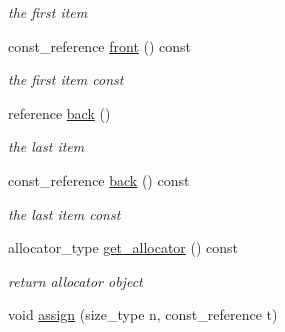 \begin{DoxyCompactItemize}
\begin{DoxyCompactList}\small\item\em the first item \end{DoxyCompactList}\item 
\hypertarget{classtbb_1_1concurrent__vector_a8fdef8cb75cfa456995c1d5f0ed4f13c}{}const\+\_\+reference \hyperlink{classtbb_1_1concurrent__vector_a8fdef8cb75cfa456995c1d5f0ed4f13c}{front} () const \label{classtbb_1_1concurrent__vector_a8fdef8cb75cfa456995c1d5f0ed4f13c}

\begin{DoxyCompactList}\small\item\em the first item const \end{DoxyCompactList}\item 
\hypertarget{classtbb_1_1concurrent__vector_a151715638a6fa55054afa4fd500a0283}{}reference \hyperlink{classtbb_1_1concurrent__vector_a151715638a6fa55054afa4fd500a0283}{back} ()\label{classtbb_1_1concurrent__vector_a151715638a6fa55054afa4fd500a0283}

\begin{DoxyCompactList}\small\item\em the last item \end{DoxyCompactList}\item 
\hypertarget{classtbb_1_1concurrent__vector_a37314415672c42215de382478c5024ab}{}const\+\_\+reference \hyperlink{classtbb_1_1concurrent__vector_a37314415672c42215de382478c5024ab}{back} () const \label{classtbb_1_1concurrent__vector_a37314415672c42215de382478c5024ab}

\begin{DoxyCompactList}\small\item\em the last item const \end{DoxyCompactList}\item 
\hypertarget{classtbb_1_1concurrent__vector_affc6f3b47d228af31d9bee5cead70e8d}{}allocator\+\_\+type \hyperlink{classtbb_1_1concurrent__vector_affc6f3b47d228af31d9bee5cead70e8d}{get\+\_\+allocator} () const \label{classtbb_1_1concurrent__vector_affc6f3b47d228af31d9bee5cead70e8d}

\begin{DoxyCompactList}\small\item\em return allocator object \end{DoxyCompactList}\item 
\hypertarget{classtbb_1_1concurrent__vector_a6faee8d72aa6659a71450bb770cc7a9a}{}void \hyperlink{classtbb_1_1concurrent__vector_a6faee8d72aa6659a71450bb770cc7a9a}{assign} (size\+\_\+type n, const\+\_\+reference t)\label{classtbb_1_1concurrent__vector_a6faee8d72aa6659a71450bb770cc7a9a}


\end{DoxyCompactItemize}

